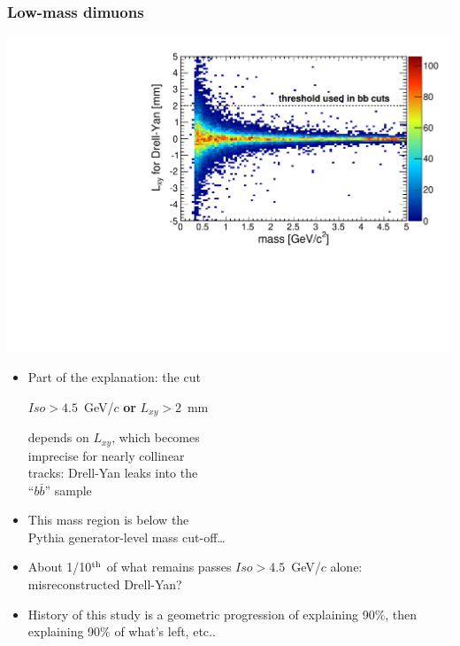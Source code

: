 \documentclass[compress]{beamer}
\newcommand{\s}[1]{{\mbox{\scriptsize #1}}}
\begin{document}
\begin{frame}
\frametitle{Low-mass dimuons}

\hfill \includegraphics[width=0.45\linewidth]{lxyresolution.pdf}

\vspace{-3.7 cm}
\begin{itemize}
\item Part of the explanation: the cut

$Iso > 4.5$~GeV/$c$ {\bf or} $L_{xy} > 2$~mm

depends on $L_{xy}$, which becomes \\ imprecise for nearly collinear \\
tracks: Drell-Yan leaks into the \\ ``$b\bar{b}$'' sample

\item This mass region is below the \\ Pythia generator-level mass
  cut-off\ldots

\item About 1/10$^\s{th}$ of what remains passes $Iso > 4.5$~GeV/$c$
  alone: misreconstructed Drell-Yan?

\item History of this study is a geometric progression of explaining 90\%, then explaining 90\% of what's left, etc..
\end{itemize}
\end{frame}
\end{document}
